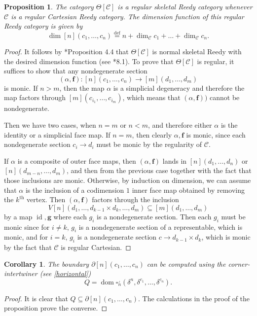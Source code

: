 \documentclass[leqno]{article}
\numberwithin{equation}{subsection}
\theoremstyle{plain}   %
\newtheorem{prop}[equation]{Proposition}
\newtheorem{cor}[equation]{Corollary}
\theoremstyle{remark}
\theoremstyle{plain}
\providecommand{\C}{}
\renewcommand{\C}{\ensuremath{\mathcal{C}}}
\newcommand{\defeq}{\overset{\mathrm{def}}=}
\begin{document}
\begin{prop} 
	The category \(\Theta[\C]\) is a regular skeletal Reedy category whenever \(\C\) is a regular Cartesian Reedy category.  The dimension function of this regular Reedy category is given by 
	\[\dim[n](c_1,\dots,c_n)\defeq n+\dim_\C c_1 + \dots + \dim_\C c_n.\]
\end{prop}
\begin{proof} 
	It follows by \cite{bergner-rezk-reedy}*{Proposition 4.4} that \(\Theta[\C]\) is normal skeletal Reedy with the desired dimension function (see \cite{cisinski-book}*{8.1}). To prove that \(\Theta[\C]\) is regular, it suffices to show that any nondegenerate section 
	\[(\alpha,\mathbf{f}):[n](c_1,\dots,c_n) \to [m](d_1,\dots, d_m)\]
	is monic.  If \(n>m\), then the map \(\alpha\) is a simplicial degeneracy and therefore the map factors through \([m](c_{i_1},\dots,c_{i_m})\), which means that \((\alpha,\mathbf{f}))\) cannot be nondegenerate.  
	
	Then we have two cases, when \(n=m\) or \(n<m\), and therefore either \(\alpha\) is the identity or a simplicial face map.  If \(n=m\), then clearly \(\alpha, \mathbf{f}\) is monic, since each nondegenerate section \(c_i\to d_i\) must be monic by the regularity of \(\C\).
	
	If \(\alpha\) is a composite of outer face maps, then \((\alpha,\mathbf{f})\) lands in \([n](d_1,\dots,d_n)\) or \([n](d_{m-n},\dots, d_m)\), and then from the previous case together with the fact that those inclusions are monic.  Otherwise, by induction on dimension, we can assume that \(\alpha\) is the inclusion of a codimension \(1\) inner face map obtained by removing the \(k^\mathrm{th}\) vertex. Then \((\alpha,\mathbf{f})\) factors through the inclusion \[V[n](d_1,\dots,d_{k-1} \times d_k,\dots, d_m) \subseteq [m](d_1,\dots,d_m)\] by a map \(\operatorname{id}, \mathbf{g}\) where each \(g_i\) is a nondegenerate section.  Then each \(g_i\) must be monic since for \(i\neq k\), \(g_i\) is a nondegenerate section of a representable, which is monic, and for \(i=k\), \(g_i\) is a nondegenerate section \(c\to d_{k-1} \times d_k\), which is monic by the fact that \(\C\) is regular Cartesian.
\end{proof}
\begin{cor} The boundary \(\partial[n](c_1,\dots,c_n)\) can be computed using the corner-intertwiner (see \ref{horizontal})
	\[Q=\operatorname{dom} \square^\lrcorner_n(\delta^n, \delta^{c_1}, \dots, \delta^{c_n}).\]
\end{cor}
\begin{proof}
	It is clear that \(Q\subseteq \partial [n](c_1,\dots,c_n)\).  The calculations in the proof of the proposition prove the converse.  
\end{proof}
\end{document}
